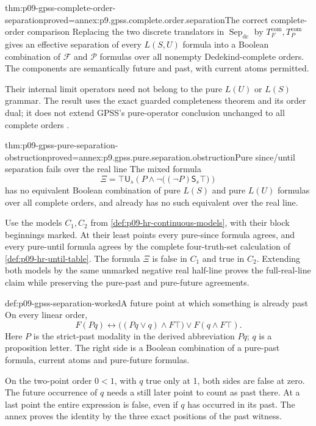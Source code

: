\begin{hbtheorem}{thm:p09-gpss-complete-order-separation}{proved=annex:p9.gpss.complete.order.separation}{The correct complete-order comparison}
Replacing the two discrete translators in
\(\operatorname{Sep}_{\mathrm{dc}}\) by
\(T_F^{\mathrm{com}},T_P^{\mathrm{com}}\)
gives an effective separation of every
\(L(S,U)\) formula into a Boolean combination
of \(\mathcal F\) and \(\mathcal P\) formulas
over all nonempty Dedekind-complete orders.
The components are semantically future and
past, with current atoms permitted.

Their internal limit operators need not
belong to the pure \(L(U)\) or \(L(S)\)
grammar. The result uses the exact guarded
completeness theorem and its order dual;
it does not extend GPSS's pure-operator
conclusion unchanged to all complete orders
\cite[Theorem~7.4]{Rabinovich2014Kamp}.
\end{hbtheorem}

\begin{hbtheorem}{thm:p09-gpss-pure-separation-obstruction}{proved=annex:p9.gpss.pure.separation.obstruction}{Pure since/until separation fails over the real line}
The mixed formula
\[
 \Xi=
 \top\mathbin{\mathsf U_s}
       \left(P\land
          \neg\bigl((\neg P)\mathbin{\mathsf S_s}\top\bigr)\right)
\]
has no equivalent Boolean combination of
pure \(L(S)\) and pure \(L(U)\) formulas
over all complete orders, and already
has no such equivalent over the real line.

Use the models \(C_1,C_2\) from
\cref{def:p09-hr-continuous-models}, with
their block beginnings marked. At their
least points every pure-since formula
agrees, and every pure-until formula
agrees by the complete four-truth-set
calculation of \cref{def:p09-hr-until-table}.
The formula \(\Xi\) is false in \(C_1\)
and true in \(C_2\). Extending both
models by the same unmarked negative
real half-line proves the full-real-line
claim while preserving the pure-past
and pure-future agreements.
\end{hbtheorem}

\begin{hbexample}{def:p09-gpss-separation-worked}{A future point at which something is already past}
On every linear order,
\[
 F(Pq)\longleftrightarrow
       \bigl((Pq\lor q)\land F\top\bigr)
                    \lor F(q\land F\top).
\]
Here \(P\) is the strict-past modality
in the derived abbreviation \(Pq\);
\(q\) is a proposition letter.
The right side is a Boolean combination
of a pure-past formula, current atoms
and pure-future formulas.

On the two-point order \(0<1\), with
\(q\) true only at 1, both sides are
false at zero. The future occurrence
of \(q\) needs a still later point
to count as past there. At a last
point the entire expression is false,
even if \(q\) has occurred in its past.
The annex proves the identity by the
three exact positions of the past witness.
\end{hbexample}
